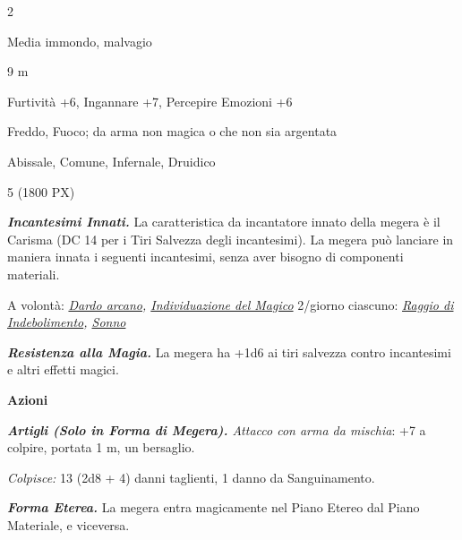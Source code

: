 \begin{multicols}{2}
{
\begin{description}[noitemsep, topsep=0pt, parsep=0pt, partopsep=0pt, itemsep=1pt, leftmargin=2.35cm,  labelwidth=2.2cm, itemindent=0cm, listparindent=0pt] %
\setlength{\baselineskip}{10pt}
\item[\textbf{Taglia/Tipo}] Media immondo, malvagio
\item[\textbf{Caratt.}] 
\item[\textbf{Punti Ferita}] 
\item[\textbf{Movimento}] 9 m
\item[\textbf{Tiri Salvez.}] 
\item[\textbf{Comp.}] Furtività +6, Ingannare +7, Percepire Emozioni +6
\item[\textbf{Res. Danni}] Freddo, Fuoco; da arma non magica o che non sia argentata
\item[\textbf{Sensi}] 
\item[\textbf{Linguaggi}] Abissale, Comune, Infernale, Druidico
\item[\textbf{Sfida}] 5 (1800 PX)
\end{description}
\smallskip

\emph{\textbf{Incantesimi Innati.}} La caratteristica da incantatore innato della megera è il Carisma (DC 14 per i Tiri Salvezza degli incantesimi). La megera può lanciare in maniera innata i seguenti incantesimi, senza aver bisogno di componenti materiali.

A volontà: \emph{\hyperlink{Dardo arcano}{Dardo arcano}, \hyperlink{Individuazione del Magico}{Individuazione del Magico}} 2/giorno ciascuno: \emph{\hyperlink{Raggio di Indebolimento}{Raggio di Indebolimento}, \hyperlink{Sonno}{Sonno}}

\emph{\textbf{Resistenza alla Magia.}} La megera ha +1d6 ai tiri salvezza contro incantesimi e altri effetti magici.

\textbf{Azioni}

\emph{\textbf{Artigli (Solo in Forma di Megera).} Attacco con arma da mischia}: +7 a colpire, portata 1 m, un bersaglio.

\emph{Colpisce:} 13 (2d8 + 4) danni taglienti, 1 danno da Sanguinamento.

\emph{\textbf{Forma Eterea.}} La megera entra magicamente nel Piano Etereo dal Piano Materiale, e viceversa.

}
\end{multicols}
